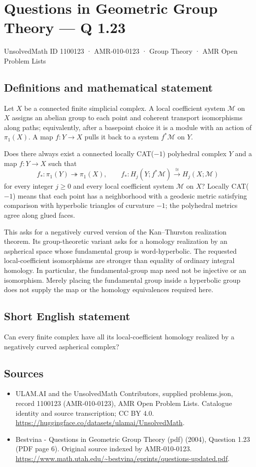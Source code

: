 \documentclass[11pt,a4paper]{article}
\begin{document}
\section*{Questions in Geometric Group Theory — Q 1.23}\label{1100123}
{\small UnsolvedMath ID 1100123 · AMR-010-0123 · Group Theory · AMR Open Problem Lists}
\subsection{Definitions and mathematical statement}
Let $X$ be a connected finite simplicial complex. A local coefficient system $\mathcal M$ on $X$ assigns an abelian group to each point and coherent transport isomorphisms along paths; equivalently, after a basepoint choice it is a module with an action of $\pi_1(X)$. A map $f:Y\to X$ pulls it back to a system $f^*\mathcal M$ on $Y$.

Does there always exist a connected locally CAT($-1$) polyhedral complex $Y$ and a map $f:Y\to X$ such that
\[
 f_*:\pi_1(Y)\twoheadrightarrow\pi_1(X),\qquad
 f_*:H_j(Y;f^*\mathcal M)\xrightarrow{\cong}H_j(X;\mathcal M)
\]
for every integer $j\geq0$ and every local coefficient system $\mathcal M$ on $X$? Locally CAT($-1$) means that each point has a neighborhood with a geodesic metric satisfying comparison with hyperbolic triangles of curvature $-1$; the polyhedral metrics agree along glued faces.

This asks for a negatively curved version of the Kan--Thurston realization theorem. Its group-theoretic variant asks for a homology realization by an aspherical space whose fundamental group is word-hyperbolic. The requested local-coefficient isomorphisms are stronger than equality of ordinary integral homology. In particular, the fundamental-group map need not be injective or an isomorphism. Merely placing the fundamental group inside a hyperbolic group does not supply the map or the homology equivalences required here.
\subsection{Short English statement}
Can every finite complex have all its local-coefficient homology realized by a negatively curved aspherical complex?
\subsection{Sources}
\begin{itemize}
\item[S1] ULAM.AI and the UnsolvedMath Contributors, supplied problems.json, record 1100123 (AMR-010-0123), AMR Open Problem Lists. Catalogue identity and source transcription; CC BY 4.0.
\url{https://huggingface.co/datasets/ulamai/UnsolvedMath}.
\item[S2] Bestvina - Questions in Geometric Group Theory (pdf) (2004), Question 1.23 (PDF page 6). Original source indexed by AMR-010-0123.
\url{https://www.math.utah.edu/~bestvina/eprints/questions-updated.pdf}.
\end{itemize}
\end{document}
